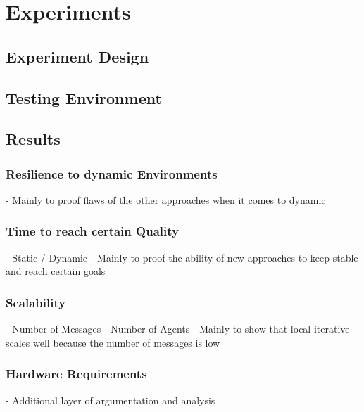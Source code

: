 \chapter{Experiments}
\section{Experiment Design}
\section{Testing Environment}
\section{Results}
\subsection{Resilience to dynamic Environments}
- Mainly to proof flaws of the other approaches when it comes to dynamic
\subsection{Time to reach certain Quality}
- Static / Dynamic
- Mainly to proof the ability of new approaches to keep stable and reach certain goals
\subsection{Scalability}
-  Number of Messages
- Number of Agents
- Mainly to show that local-iterative scales well because the number of messages is low
\subsection{Hardware Requirements}
- Additional layer of argumentation and analysis
